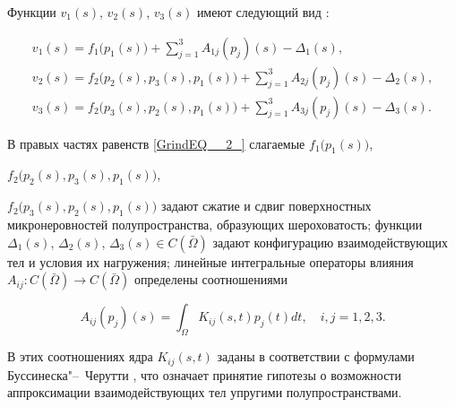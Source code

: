 Функции $v_{1}(s)$, $v_{2}(s)$, $v_{3}(s)$ имеют следующий вид \cite{al:bib13}:



\begin{equation} 

\label{GrindEQ__2_} 

\begin{array}{l} 

\displaystyle

{v_{1}(s)=f_{1}\bigl(p_{1}(s)\bigr)+\sum_{j=1}^{3}A_{1j}\left(p_{j}\right)(s)-\Delta_{1}(s),} 

\\ 

\displaystyle

{v_{2}(s)=f_{2}\bigl(p_{2}(s), p_{3}(s),  p_{1}(s)\bigr)+\sum_{j=1}^{3}A_{2j} \left(p_{j}\right)(s)-\Delta_{2}(s),} 

\\ 

\displaystyle

{v_{3}(s)=f_{2}\bigl(p_{3}(s),  p_{2}(s), p_{1}(s)\bigr)+\sum_{j=1}^{3}A_{3j} \left(p_{j}\right)(s)-\Delta_{3}(s).} 

\end{array}

\end{equation}

В правых частях равенств \eqref{GrindEQ__2_} слагаемые $f_{1}\bigl(p_{1}(s)\bigr)$, 

$f_{2}\bigl(p_{2}(s), p_{3}(s), p_{1}(s)\bigr)$, \linebreak 

$f_{2}\bigl(p_{3}(s), p_{2}(s), p_{1}(s)\bigr)$ задают сжатие и сдвиг поверхностных микронеровностей полупространства, образующих шероховатость; функции $\Delta_{1}(s)$, $\Delta_{2}(s)$, $\Delta_{3}(s)\in C\left(\bar{\Omega }\right)$ \cite{al:bib13} задают конфигурацию взаимодействующих тел и условия их нагружения; линейные интегральные операторы влияния $A_{ij}:C\left(\bar{\Omega }\right)\to C\left(\bar{\Omega }\right)$ определены соотношениями

\[

A_{i  j} \left(p_{j} \right)(s)=\int _{\Omega }K_{i  j} (s,t) p_{j} (t)dt,\quad i,j=1, 2, 3.

\]

В этих соотношениях ядра $K_{i  j}(s,t)$ заданы в соответствии с формулами Буссинеска"--~Черутти \cite{al:bib14}, что означает принятие гипотезы о возможности аппроксимации взаимодействующих тел упругими полупространствами.



